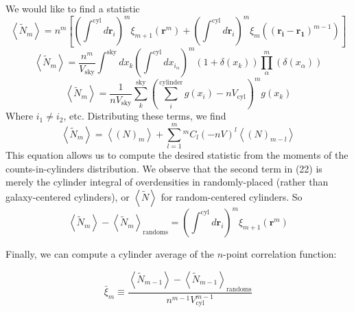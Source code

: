 \documentclass[fleqn,usenatbib]{mnras}
\newcommand*{\Comb}[2]{{}^{#1}C_{#2}}%
\begin{document}
We would like to find a statistic
\begin{equation}
\left<\tilde{N}_m\right> = n^m \left[\left(\int^{\text{cyl}}d\mathbf{r}_i\right)^{m}\xi_{m+1}(\mathbf{r}^{m}) + \left(\int^{\text{cyl}}d\mathbf{r}_i\right)^{m}\xi_m(\mathbf{(r_i-r_1)}^{m-1})\right]
\end{equation}
\begin{equation}
\left<\tilde{N}_m\right> = \frac{n^m}{V_{\text{sky}}}\int^{\text{sky}}dx_k\left(\int^{\text{cyl}}dx_{i_\alpha}\right)^m  (1+\delta(x_k))\prod_\alpha^m (\delta(x_\alpha))
\end{equation}
\begin{equation}
\left<\tilde{N}_m\right> =  \frac{1}{nV_{\text{sky}}}\sum_k^{\text{sky}}\left(\sum_i^{\text{cylinder}}g(x_i) - nV_{\text{cyl}}\right)^{m} g(x_k) 
\end{equation}
Where $i_1 \neq i_2$, etc. Distributing these terms, we find
\begin{equation}
\left<\tilde{N}_m\right> =  \left<(N)_m\right>+ \sum_{l=1}^m\Comb{m}{l}(-nV)^l\left<(N)_{m-l}\right>
\end{equation}
This equation allows us to compute the desired statistic from the moments of the counts-in-cylinders distribution.
We observe that the second term in (22) is merely the cylinder integral of overdensities in randomly-placed (rather than galaxy-centered cylinders), or $\left<\tilde{N}\right>$ for random-centered cylinders. So
\begin{equation}
\left<\tilde{N}_m\right> - \left<\tilde{N}_m\right>_{\text{randoms}} = \left(\int^{\text{cyl}}d\mathbf{r}_i\right)^{m}\xi_{m+1}(\mathbf{r}^{m})
\end{equation}

Finally, we can compute a cylinder average of the $n$-point correlation function:

\begin{equation}
\bar{\xi}_m \equiv \frac{\left<\tilde{N}_{m-1}\right> - \left<\tilde{N}_{m-1}\right>_{\text{randoms}}}{n^{m-1}V_{\text{cyl}}^{m-1}}
\end{equation}



\end{document}
